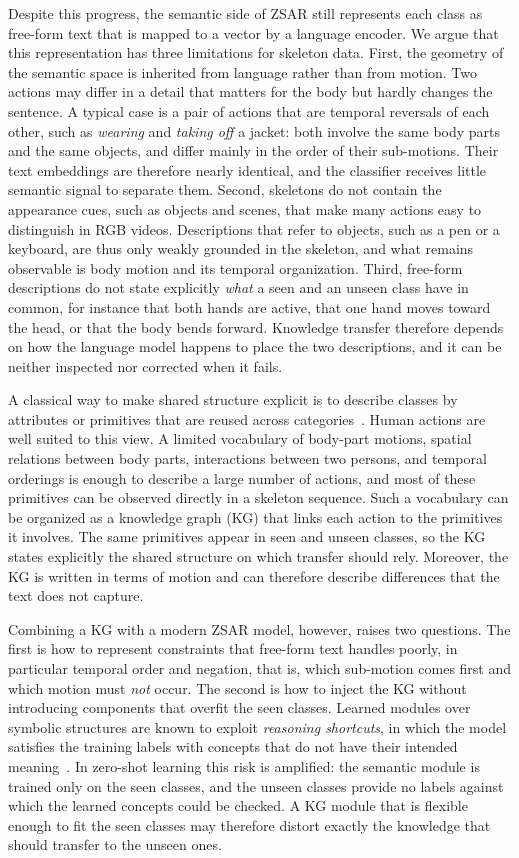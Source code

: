 \documentclass[11pt]{article}
\begin{document}
Despite this progress, the semantic side of ZSAR still represents each class as free-form text that is mapped to a vector by a language encoder. We argue that this representation has three limitations for skeleton data. First, the geometry of the semantic space is inherited from language rather than from motion. Two actions may differ in a detail that matters for the body but hardly changes the sentence. A typical case is a pair of actions that are temporal reversals of each other, such as \emph{wearing} and \emph{taking off} a jacket: both involve the same body parts and the same objects, and differ mainly in the order of their sub-motions. Their text embeddings are therefore nearly identical, and the classifier receives little semantic signal to separate them. Second, skeletons do not contain the appearance cues, such as objects and scenes, that make many actions easy to distinguish in RGB videos. Descriptions that refer to objects, such as a pen or a keyboard, are thus only weakly grounded in the skeleton, and what remains observable is body motion and its temporal organization. Third, free-form descriptions do not state explicitly \emph{what} a seen and an unseen class have in common, for instance that both hands are active, that one hand moves toward the head, or that the body bends forward. Knowledge transfer therefore depends on how the language model happens to place the two descriptions, and it can be neither inspected nor corrected when it fails.

A classical way to make shared structure explicit is to describe classes by attributes or primitives that are reused across categories~\cite{lampert14,xian18}. Human actions are well suited to this view. A limited vocabulary of body-part motions, spatial relations between body parts, interactions between two persons, and temporal orderings is enough to describe a large number of actions, and most of these primitives can be observed directly in a skeleton sequence. Such a vocabulary can be organized as a knowledge graph (KG) that links each action to the primitives it involves. The same primitives appear in seen and unseen classes, so the KG states explicitly the shared structure on which transfer should rely. Moreover, the KG is written in terms of motion and can therefore describe differences that the text does not capture.

Combining a KG with a modern ZSAR model, however, raises two questions. The first is how to represent constraints that free-form text handles poorly, in particular temporal order and negation, that is, which sub-motion comes first and which motion must \emph{not} occur. The second is how to inject the KG without introducing components that overfit the seen classes. Learned modules over symbolic structures are known to exploit \emph{reasoning shortcuts}, in which the model satisfies the training labels with concepts that do not have their intended meaning~\cite{marconato26,andolfi25}. In zero-shot learning this risk is amplified: the semantic module is trained only on the seen classes, and the unseen classes provide no labels against which the learned concepts could be checked. A KG module that is flexible enough to fit the seen classes may therefore distort exactly the knowledge that should transfer to the unseen ones.
\end{document}
